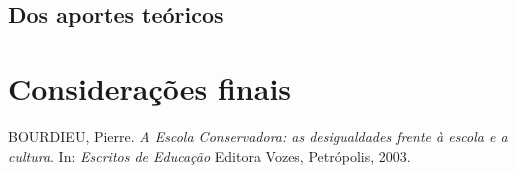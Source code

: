 \documentclass[12pt,a4paper]{article}
\begin{document}
	\subsection{Dos aportes teóricos}

	\newpage

	\section{Considerações finais}

	
	\begin{thebibliography}{9}
		
		BOURDIEU, Pierre. 
		\textit{A Escola Conservadora: as desigualdades 
		frente à escola e a cultura}. 
		In: \textit{Escritos de Educação} 
		Editora Vozes, Petrópolis, 2003.
				

	\end{thebibliography}
	
	
	
\end{document}
